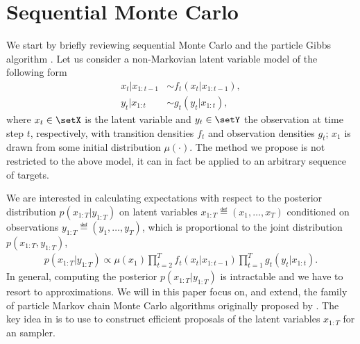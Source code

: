 
\section{Sequential Monte Carlo}
\label{sec:part:smc:smc}

We start by briefly reviewing sequential Monte Carlo \citep{gordon1993novel,doucet2001sequential} and the particle Gibbs algorithm \citep{andrieuDH2010}. Let us consider a non-Markovian latent variable model of the following form
\begin{subequations}
	\label{eq:ssm}
	\begin{alignat}{2}
	x_t | x_{1:t-1} &\sim f_t(x_t | x_{1:t-1}), \\
	y_t | x_{1:t} &\sim g_t(y_t|x_{1:t}),
	\end{alignat}
\end{subequations}
where $x_t \in \setX$ is the latent variable and $y_t \in \setY$ the observation at time step $t$, respectively,
with transition densities $f_t$ and observation densities $g_t$; $x_1$ is drawn from some initial distribution $\mu(\cdot)$. The method we propose is not restricted to the above model, it can in fact be applied to an arbitrary sequence of targets.


We are interested in calculating expectations with respect to the posterior distribution $p(x_{1:T}|y_{1:T})$ on latent variables $x_{1:T} \eqdef (x_1,\ldots,x_T)$ conditioned on observations $y_{1:T} \eqdef (y_1,\ldots,y_T)$, which is proportional to the joint distribution $p(x_{1:T}, y_{1:T})$,
\begin{align}
\label{eq:jointdistribution}
p(x_{1:T} | y_{1:T}) \propto  \mu(x_1) \prod_{t=2}^T f_t(x_t | x_{1:t-1}) \prod_{t=1}^T g_t(y_t|x_{1:t}).\nonumber
\end{align}
In general, computing the posterior $p(x_{1:T}|y_{1:T})$ is intractable and we have to resort to approximations. We will in this paper focus on, and extend, the family of particle Markov chain Monte Carlo algorithms originally proposed by \citet{andrieuDH2010}. The key idea in \pmcmc is to use \smc to construct efficient proposals of the latent variables $x_{1:T}$ for an \mcmc sampler.

